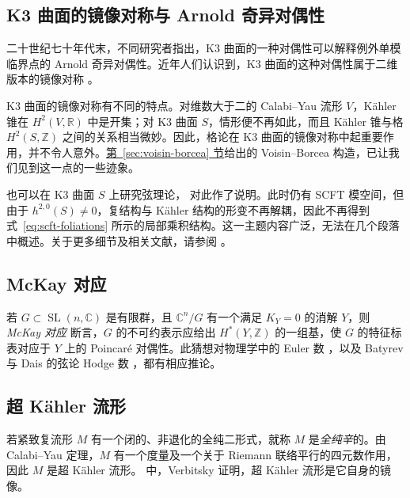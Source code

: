 \subsection{K3 曲面的镜像对称与 Arnold 奇异对偶性}\label{subsec:k3-arnold-strange-duality}
二十世纪七十年代末，不同研究者指出，K3 曲面的一种对偶性可以解释例外单模临界点的 Arnold 奇异对偶性。近年人们认识到，K3 曲面的这种对偶性属于二维版本的镜像对称 。

K3 曲面的镜像对称有不同的特点。对维数大于二的 Calabi--Yau 流形 $V$，Kähler 锥在 $H^2(V,\mathbb R)$ 中是开集；对 K3 曲面 $S$，情形便不再如此，而且 Kähler 锥与格 $H^2(S,\mathbb Z)$ 之间的关系相当微妙。因此，格论在 K3 曲面的镜像对称中起重要作用，并不令人意外。\hyperref[sec:voisin-borcea]{第~\ref*{sec:voisin-borcea} 节}给出的 Voisin--Borcea 构造，已让我们见到这一点的一些迹象。

也可以在 K3 曲面 $S$ 上研究弦理论， 对此作了说明。此时仍有 SCFT 模空间，但由于 $h^{2,0}(S)\ne0$，复结构与 Kähler 结构的形变不再解耦，因此不再得到
式~\eqref{eq:scft-foliations} 所示的局部乘积结构。这一主题内容广泛，无法在几个段落中概述。关于更多细节及相关文献，请参阅 。

\subsection{McKay 对应}\label{subsec:mckay-correspondence}
若 $G\subset\operatorname{SL}(n,\mathbb C)$ 是有限群，且 $\mathbb C^n/G$ 有一个满足 $K_Y=0$ 的消解 $Y$，则 \emph{McKay 对应}  断言，$G$ 的不可约表示应给出 $H^*(Y,\mathbb Z)$ 的一组基，使 $G$ 的特征标表对应于 $Y$ 上的 Poincaré 对偶性。此猜想对物理学中的 Euler 数 ，以及 Batyrev 与 Dais 的弦论 Hodge 数 ，都有相应推论。

\subsection{超 Kähler 流形}\label{subsec:hyperkahler-manifolds}
若紧致复流形 $M$ 有一个闭的、非退化的全纯二形式，就称 $M$ 是\emph{全纯辛}的。由 Calabi--Yau 定理，$M$ 有一个度量及一个关于 Riemann 联络平行的四元数作用，因此 $M$ 是超 Kähler 流形。 中，Verbitsky 证明，超 Kähler 流形是它自身的镜像。


